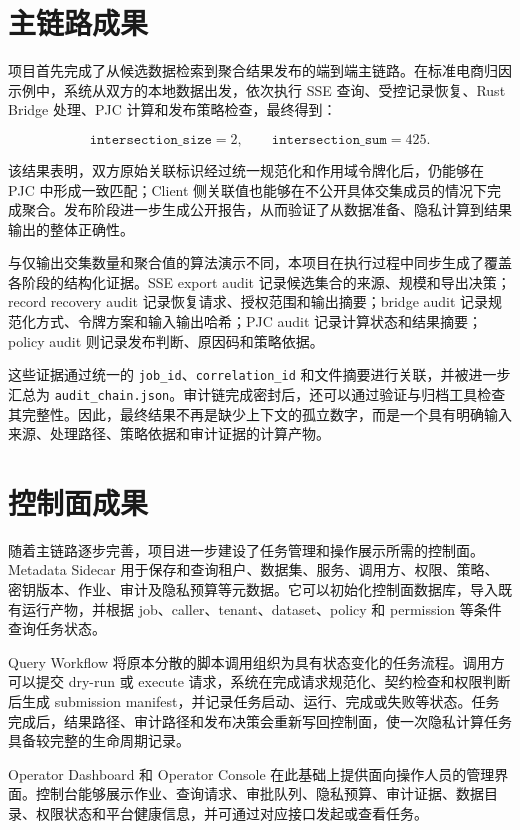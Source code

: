 \documentclass[UTF8,a4paper,12pt,oneside]{ctexrep}
\begin{document}
\section{主链路成果}

项目首先完成了从候选数据检索到聚合结果发布的端到端主链路。在标准电商归因示例中，系统从双方的本地数据出发，依次执行 SSE 查询、受控记录恢复、Rust Bridge 处理、PJC 计算和发布策略检查，最终得到：

\begin{equation}
\texttt{intersection\_size}=2,
\qquad
\texttt{intersection\_sum}=425.
\end{equation}

该结果表明，双方原始关联标识经过统一规范化和作用域令牌化后，仍能够在 PJC 中形成一致匹配；Client 侧关联值也能够在不公开具体交集成员的情况下完成聚合。发布阶段进一步生成公开报告，从而验证了从数据准备、隐私计算到结果输出的整体正确性。

与仅输出交集数量和聚合值的算法演示不同，本项目在执行过程中同步生成了覆盖各阶段的结构化证据。SSE export audit 记录候选集合的来源、规模和导出决策；record recovery audit 记录恢复请求、授权范围和输出摘要；bridge audit 记录规范化方式、令牌方案和输入输出哈希；PJC audit 记录计算状态和结果摘要；policy audit 则记录发布判断、原因码和策略依据。

这些证据通过统一的 \texttt{job\_id}、\texttt{correlation\_id} 和文件摘要进行关联，并被进一步汇总为 \texttt{audit\_chain.json}。审计链完成密封后，还可以通过验证与归档工具检查其完整性。因此，最终结果不再是缺少上下文的孤立数字，而是一个具有明确输入来源、处理路径、策略依据和审计证据的计算产物。

\section{控制面成果}

随着主链路逐步完善，项目进一步建设了任务管理和操作展示所需的控制面。Metadata Sidecar 用于保存和查询租户、数据集、服务、调用方、权限、策略、密钥版本、作业、审计及隐私预算等元数据。它可以初始化控制面数据库，导入既有运行产物，并根据 job、caller、tenant、dataset、policy 和 permission 等条件查询任务状态。

Query Workflow 将原本分散的脚本调用组织为具有状态变化的任务流程。调用方可以提交 dry-run 或 execute 请求，系统在完成请求规范化、契约检查和权限判断后生成 submission manifest，并记录任务启动、运行、完成或失败等状态。任务完成后，结果路径、审计路径和发布决策会重新写回控制面，使一次隐私计算任务具备较完整的生命周期记录。

Operator Dashboard 和 Operator Console 在此基础上提供面向操作人员的管理界面。控制台能够展示作业、查询请求、审批队列、隐私预算、审计证据、数据目录、权限状态和平台健康信息，并可通过对应接口发起或查看任务。
\end{document}
